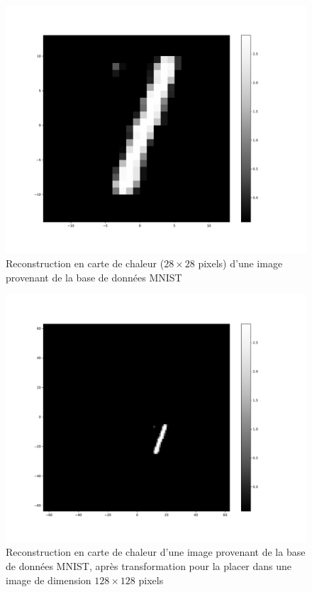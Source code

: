 \begin{figure}[th]
\centering
\includegraphics[scale=0.3]{Figures/MNIST_28}
\decoRule
\caption[Figure]{Reconstruction en carte de chaleur ($28\times 28$ pixels) d'une image provenant de la base de données MNIST}
\label{fig:MNIST_28}
\end{figure}

\begin{figure}[th]
\centering
\includegraphics[scale=0.3]{Figures/mnist_128}
\decoRule
\caption[Figure]{Reconstruction en carte de chaleur d'une image provenant de la base de données MNIST, après transformation pour la placer dans une image de dimension $128\times 128$ pixels}
\label{fig:MNIST_128}
\end{figure}

